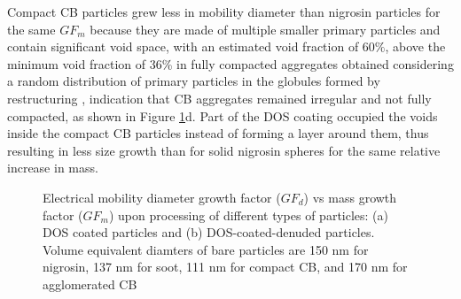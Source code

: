 Compact CB particles grew less in mobility diameter than nigrosin particles for the same $GF_m$ because they are made of multiple smaller primary particles and contain significant void space, with an estimated void fraction of $60\%$, above the minimum void fraction of 36\% in fully compacted aggregates obtained considering a random distribution of primary particles in the globules formed by restructuring \citep{RN18}, indication that CB aggregates remained irregular and not fully compacted, as shown in Figure \ref{fig:gfd}d. Part of the DOS coating occupied the voids inside the compact CB particles instead of forming a layer around them, thus resulting in less size growth than for solid nigrosin spheres for the same relative increase in mass.

\begin{figure}[htp]
    \centering
    \caption{Electrical mobility diameter growth factor ($GF_d$) vs mass growth factor ($GF_{ m}$) upon processing of different types of particles: (a) DOS coated particles and (b) DOS-coated-denuded particles. Volume equivalent diamters of bare particles are 150 nm for nigrosin, 137 nm for soot, 111 nm for compact CB, and 170 nm for agglomerated CB}
    \label{fig:gfd}
\end{figure}

